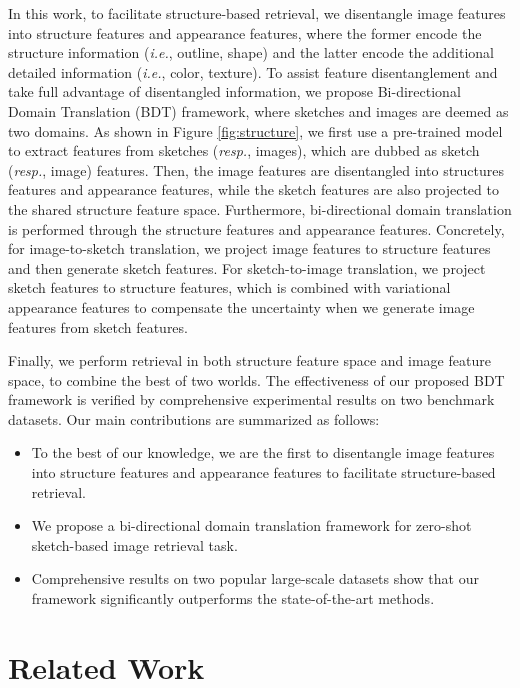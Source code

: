 \documentclass[10pt,twocolumn,letterpaper]{article}
\begin{document}
In this work, to facilitate structure-based retrieval, we disentangle image features into structure features and appearance features, where the former encode the structure information (\emph{i.e.}, outline, shape) and the latter encode the additional detailed information (\emph{i.e.}, color, texture).
To assist feature disentanglement and take full advantage of disentangled information, we propose Bi-directional Domain Translation (BDT) framework, where sketches and images are deemed as two domains. 
As shown in Figure \ref{fig:structure}, we first use a pre-trained model to extract features from sketches (\emph{resp.}, images), which are dubbed as sketch (\emph{resp.}, image) features. 
Then, the image features are disentangled into structures features and appearance features, while the sketch features are also projected to the shared structure feature space. 
Furthermore, bi-directional domain translation is performed through the structure features and appearance features.
Concretely, for image-to-sketch translation, we project image features to structure features and then generate sketch features. For sketch-to-image translation, we project sketch features to structure features, which is combined with variational appearance features to compensate the uncertainty when we generate image features from sketch features.
 
Finally, we perform retrieval in both structure feature space and image feature space, to combine the best of two worlds. 
The effectiveness of our proposed BDT framework is verified by comprehensive experimental results on two benchmark datasets. Our main contributions are summarized as follows:
\begin{itemize}
    \item To the best of our knowledge, we are the first to disentangle image features into structure features and appearance features to facilitate structure-based retrieval.
    \item We propose a bi-directional domain translation framework for zero-shot sketch-based image retrieval task.
    \item Comprehensive results on two popular large-scale datasets show that our framework significantly outperforms the state-of-the-art methods.
\end{itemize}

\section{Related Work}
\end{document}
